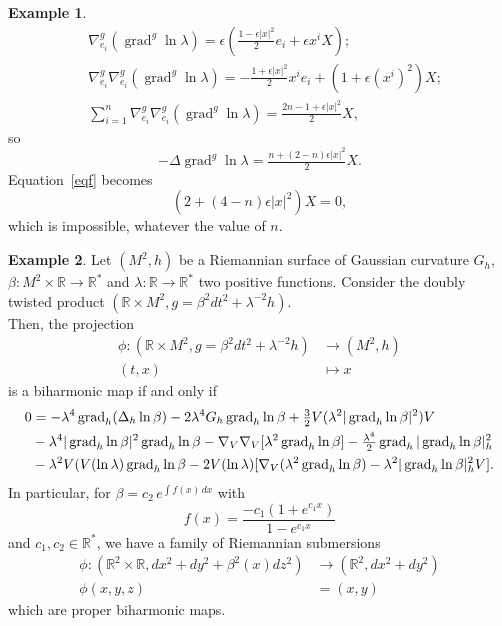 \documentclass[12pt]{amsart}
\theoremstyle{plain}
\theoremstyle{definition}
\newtheorem{ex}{Example}
\begin{document}
\begin{ex}
\begin{align*}
&\nabla^{g}_{e_{i}} (\operatorname{grad}^g \ln\lambda)  = \epsilon (\tfrac{1-\epsilon |x|^2}{2} e_i + \epsilon x^i X) ;\\
&\nabla^{g}_{e_{i}}\nabla^{g}_{e_{i}} (\operatorname{grad}^g \ln\lambda) = - \tfrac{1 + \epsilon |x|^2}{2} x^i e_i + (1+ \epsilon (x^i)^2)X ;\\
&\sum_{i=1}^{n} \nabla^{g}_{e_{i}}\nabla^{g}_{e_{i}} (\operatorname{grad}^g \ln\lambda) = \tfrac{2n-1
+ \epsilon |x|^2}{2} X,
\end{align*}
so
$$- \Delta \operatorname{grad}^g \ln\lambda = \tfrac{n + (2-n)\epsilon |x|^2}{2} X.$$
Equation~\eqref{eqf} becomes
$$ (2 + (4-n)\epsilon|x|^2) X =0,$$
which is impossible, whatever the value of $n$.
\end{ex}

\begin{ex}
Let $(M^2 ,h)$ be a Riemannian surface of Gaussian curvature $G_h$, $\beta : M^2 \times {{\mathbb R}} \to {{\mathbb R}}^{*}$ and
$\lambda : {{\mathbb R}} \to {{\mathbb R}}^{*}$ two positive functions. Consider the doubly twisted
product
$( {{\mathbb R}} \times M^2 , g= \beta^2 dt^2 + \lambda^{-2} h)$.\\
Then, the projection
\begin{align*}
\phi  : ( {{\mathbb R}} \times M^2 , g= \beta^2 dt^2 + \lambda^{-2} h) &\to (M^2 ,h) \\
(t,x) &\mapsto x
\end{align*}
is a biharmonic map if and only if
\begin{align}\label{2D}
0 &= -\lambda^4 \operatorname{grad}_{h} (\Delta_{h} \ln\beta)  - 2\lambda^4 G_{h} \operatorname{grad}_{h} \ln\beta +
\tfrac{3}{2} V(\lambda^2|\operatorname{grad}_{h}\ln \beta|^2) V\\\notag &- \lambda^4|\operatorname{grad}_{h}\ln
\beta|^2 \operatorname{grad}_{h}\ln \beta - \nabla_{V}\nabla_{V} [\lambda^2 \operatorname{grad}_{h}\ln \beta] -
\tfrac{\lambda^{4}}{2} \operatorname{grad}_{h} |\operatorname{grad}_{h} \ln\beta|_{h}^{2} \\\notag & - \lambda^2
V(V(\ln\lambda)\operatorname{grad}_h \ln\beta - 2V(\ln\lambda)[\nabla_{V} (\lambda^2 \operatorname{grad}_{h}\ln \beta)
- \lambda^2 |\operatorname{grad}_h \ln\beta |_{h}^2 V].
\end{align}
In particular, for $\beta = c_2 \, e^{\int f(x) \, dx}$ with
$$f(x) = \frac{-c_1 (1+e^{c_1 x})}{1-e^{c_1 x}}$$
and $c_1 , c_2 \in {{\mathbb R}}^*$, we have a family of Riemannian submersions
\begin{align*}
\phi : ({{\mathbb R}}^2 \times {{\mathbb R}} , dx^2 + dy^2 + \beta^2(x) dz^2) &\to ({{\mathbb R}}^2 , dx^2 + dy^2)\\
\phi(x,y,z) &= (x,y)
\end{align*}
which are proper biharmonic maps.\\


\end{ex}
\end{document}
